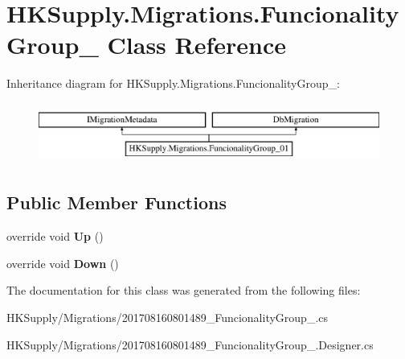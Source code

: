 \hypertarget{class_h_k_supply_1_1_migrations_1_1_funcionality_group__01}{}\section{H\+K\+Supply.\+Migrations.\+Funcionality\+Group\+\_ Class Reference}
\label{class_h_k_supply_1_1_migrations_1_1_funcionality_group__01}
Inheritance diagram for H\+K\+Supply.\+Migrations.\+Funcionality\+Group\+\_\+:\begin{figure}[H]
\begin{center}
\leavevmode
\includegraphics[height=2.000000cm]{class_h_k_supply_1_1_migrations_1_1_funcionality_group__01}
\end{center}
\end{figure}
\subsection*{Public Member Functions}
\begin{DoxyCompactItemize}
\item 
\mbox{\label{class_h_k_supply_1_1_migrations_1_1_funcionality_group__01_a86771ab4032462288a03e4732574a482}} 
override void {\bfseries Up} ()
\item 
\mbox{\label{class_h_k_supply_1_1_migrations_1_1_funcionality_group__01_a9fc9ae10437658b19ab65d10dd245b82}} 
override void {\bfseries Down} ()
\end{DoxyCompactItemize}


The documentation for this class was generated from the following files\+:\begin{DoxyCompactItemize}
\item 
H\+K\+Supply/\+Migrations/201708160801489\+\_\+\+Funcionality\+Group\+\_.\+cs\item 
H\+K\+Supply/\+Migrations/201708160801489\+\_\+\+Funcionality\+Group\+\_.\+Designer.\+cs\end{DoxyCompactItemize}
